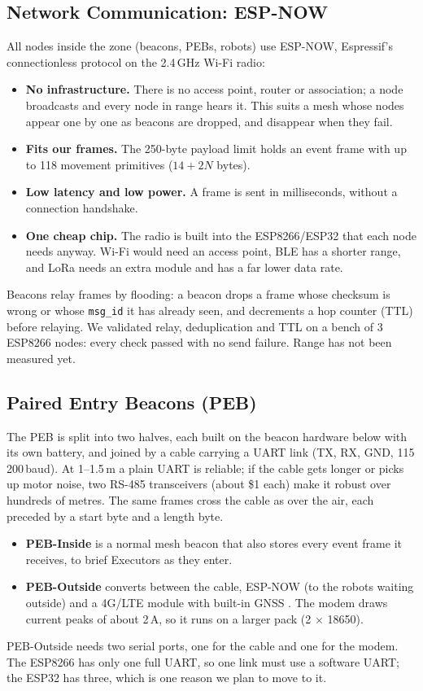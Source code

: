 \subsection{Network Communication: ESP-NOW}

All nodes inside the zone (beacons, PEBs, robots) use ESP-NOW, Espressif's
connectionless protocol on the 2.4\,GHz Wi-Fi radio:
\begin{itemize}
  \item \textbf{No infrastructure.} There is no access point, router or
    association; a node broadcasts and every node in range hears it. This
    suits a mesh whose nodes appear one by one as beacons are dropped, and
    disappear when they fail.
  \item \textbf{Fits our frames.} The 250-byte payload limit holds an event
    frame with up to 118 movement primitives ($14 + 2N$ bytes).
  \item \textbf{Low latency and low power.} A frame is sent in milliseconds,
    without a connection handshake.
  \item \textbf{One cheap chip.} The radio is built into the ESP8266/ESP32
    that each node needs anyway. Wi-Fi would need an access point, BLE has a
    shorter range, and LoRa needs an extra module and has a far lower data
    rate.
\end{itemize}
Beacons relay frames by flooding: a beacon drops a frame whose checksum is
wrong or whose \texttt{msg\_id} it has already seen, and decrements a hop
counter (TTL) before relaying. We validated relay, deduplication and TTL on a
bench of 3 ESP8266 nodes: every check passed with no send failure. Range has
not been measured yet. 

\subsection{Paired Entry Beacons (PEB)}

The PEB is split into two halves, each built on the beacon hardware below with
its own battery, and joined by a cable carrying a UART link (TX, RX, GND,
115\,200\,baud). At 1--1.5\,m a plain UART is reliable; if the cable gets
longer or picks up motor noise, two RS-485 transceivers (about \$1 each) make
it robust over hundreds of metres. The same frames cross the cable as over the
air, each preceded by a start byte and a length byte.
\begin{itemize}
  \item \textbf{PEB-Inside} is a normal mesh beacon that also stores every
    event frame it receives, to brief Executors as they enter.
  \item \textbf{PEB-Outside} converts between the cable, ESP-NOW (to the
    robots waiting outside) and a 4G/LTE module with built-in GNSS
    . The modem draws current peaks of about 2\,A, so it
    runs on a larger pack (2 $\times$ 18650).
\end{itemize}
PEB-Outside needs two serial ports, one for the cable and one for the modem.
The ESP8266 has only one full UART, so one link must use a software UART;
the ESP32 has three, which is one reason we plan to move to it.

